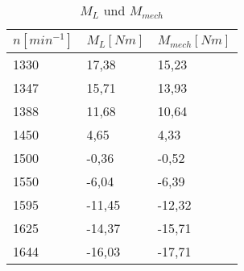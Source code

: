 \begin{table}[htbp]
    \centering
    \begin{tabularx}{\columnwidth}{XXX}
        \toprule
        $n[min^{-1}]$  & $M_L[Nm]$  & $M_{mech}[Nm]$ \\
        \midrule
        1330 & 17,38  & 15,23    \\
        1347 & 15,71  & 13,93    \\
        1388 & 11,68  & 10,64    \\
        1450 & 4,65   & 4,33     \\
        1500 & -0,36  & -0,52    \\
        1550 & -6,04  & -6,39    \\
        1595 & -11,45 & -12,32   \\
        1625 & -14,37 & -15,71   \\
        1644 & -16,03 & -17,71   \\
        \bottomrule
    \end{tabularx}
    \caption{$M_L$ und $M_{mech}$}
    \label{tab:drehmomente_vergleichen}
\end{table}

